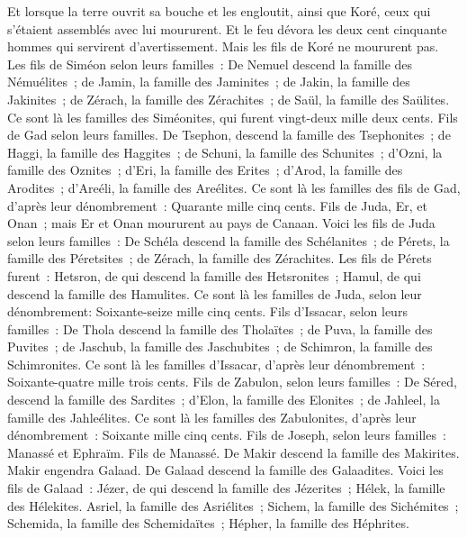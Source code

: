 \begin{multicols}{2}
Et lorsque la terre ouvrit sa bouche et les engloutit, ainsi que Koré, ceux qui s'étaient assemblés avec lui moururent. Et le feu dévora les deux cent cinquante hommes qui servirent d'avertissement.
Mais les fils de Koré ne moururent pas.
Les fils de Siméon selon leurs familles~: De Nemuel descend la famille des Némuélites~; de Jamin, la famille des Jaminites~; de Jakin, la famille des Jakinites~;
de Zérach, la famille des Zérachites~; de Saül, la famille des Saülites.
Ce sont là les familles des Siméonites, qui furent vingt-deux mille deux cents.
Fils de Gad selon leurs familles. De Tsephon, descend la famille des Tsephonites~; de Haggi, la famille des Haggites~; de Schuni, la famille des Schunites~;
d'Ozni, la famille des Oznites~; d'Eri, la famille des Erites~;
d'Arod, la famille des Arodites~; d'Areéli, la famille des Areélites.
Ce sont là les familles des fils de Gad, d'après leur dénombrement~: Quarante mille cinq cents.
Fils de Juda, Er, et Onan~; mais Er et Onan moururent au pays de Canaan.
Voici les fils de Juda selon leurs familles~: De Schéla descend la famille des Schélanites~; de Pérets, la famille des Péretsites~; de Zérach, la famille des Zérachites.
Les fils de Pérets furent~: Hetsron, de qui descend la famille des Hetsronites~; Hamul, de qui descend la famille des Hamulites.
Ce sont là les familles de Juda, selon leur dénombrement: Soixante-seize mille cinq cents.
Fils d'Issacar, selon leurs familles~: De Thola descend la famille des Tholaïtes~; de Puva, la famille des Puvites~;
de Jaschub, la famille des Jaschubites~; de Schimron, la famille des Schimronites.
Ce sont là les familles d'Issacar, d'après leur dénombrement~: Soixante-quatre mille trois cents.
Fils de Zabulon, selon leurs familles~: De Séred, descend la famille des Sardites~; d'Elon, la famille des Elonites~; de Jahleel, la famille des Jahleélites.
Ce sont là les familles des Zabulonites, d'après leur dénombrement~: Soixante mille cinq cents.
Fils de Joseph, selon leurs familles~: Manassé et Ephraïm.
Fils de Manassé. De Makir descend la famille des Makirites. Makir engendra Galaad. De Galaad descend la famille des Galaadites.
Voici les fils de Galaad~: Jézer, de qui descend la famille des Jézerites~; Hélek, la famille des Hélekites.
Asriel, la famille des Asriélites~; Sichem, la famille des Sichémites~;
Schemida, la famille des Schemidaïtes~; Hépher, la famille des Héphrites.

\end{multicols}
